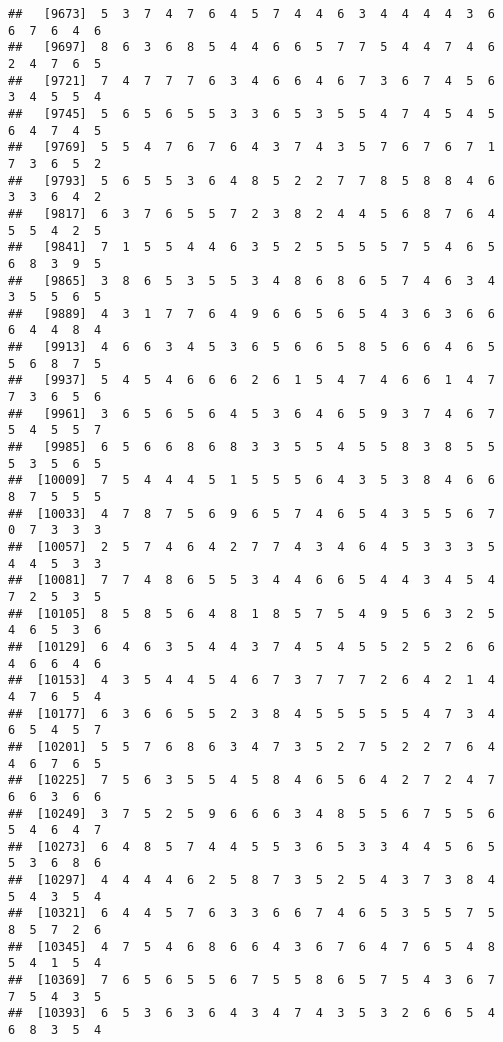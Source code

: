 \documentclass[
]{book}
\begin{document}
\begin{verbatim}
##   [9673]  5  3  7  4  7  6  4  5  7  4  4  6  3  4  4  4  4  3  6  6  7  6  4  6
##   [9697]  8  6  3  6  8  5  4  4  6  6  5  7  7  5  4  4  7  4  6  2  4  7  6  5
##   [9721]  7  4  7  7  7  6  3  4  6  6  4  6  7  3  6  7  4  5  6  3  4  5  5  4
##   [9745]  5  6  5  6  5  5  3  3  6  5  3  5  5  4  7  4  5  4  5  6  4  7  4  5
##   [9769]  5  5  4  7  6  7  6  4  3  7  4  3  5  7  6  7  6  7  1  7  3  6  5  2
##   [9793]  5  6  5  5  3  6  4  8  5  2  2  7  7  8  5  8  8  4  6  3  3  6  4  2
##   [9817]  6  3  7  6  5  5  7  2  3  8  2  4  4  5  6  8  7  6  4  5  5  4  2  5
##   [9841]  7  1  5  5  4  4  6  3  5  2  5  5  5  5  7  5  4  6  5  6  8  3  9  5
##   [9865]  3  8  6  5  3  5  5  3  4  8  6  8  6  5  7  4  6  3  4  3  5  5  6  5
##   [9889]  4  3  1  7  7  6  4  9  6  6  5  6  5  4  3  6  3  6  6  6  4  4  8  4
##   [9913]  4  6  6  3  4  5  3  6  5  6  6  5  8  5  6  6  4  6  5  5  6  8  7  5
##   [9937]  5  4  5  4  6  6  6  2  6  1  5  4  7  4  6  6  1  4  7  7  3  6  5  6
##   [9961]  3  6  5  6  5  6  4  5  3  6  4  6  5  9  3  7  4  6  7  5  4  5  5  7
##   [9985]  6  5  6  6  8  6  8  3  3  5  5  4  5  5  8  3  8  5  5  5  3  5  6  5
##  [10009]  7  5  4  4  4  5  1  5  5  5  6  4  3  5  3  8  4  6  6  8  7  5  5  5
##  [10033]  4  7  8  7  5  6  9  6  5  7  4  6  5  4  3  5  5  6  7  0  7  3  3  3
##  [10057]  2  5  7  4  6  4  2  7  7  4  3  4  6  4  5  3  3  3  5  4  4  5  3  3
##  [10081]  7  7  4  8  6  5  5  3  4  4  6  6  5  4  4  3  4  5  4  7  2  5  3  5
##  [10105]  8  5  8  5  6  4  8  1  8  5  7  5  4  9  5  6  3  2  5  4  6  5  3  6
##  [10129]  6  4  6  3  5  4  4  3  7  4  5  4  5  5  2  5  2  6  6  4  6  6  4  6
##  [10153]  4  3  5  4  4  5  4  6  7  3  7  7  7  2  6  4  2  1  4  4  7  6  5  4
##  [10177]  6  3  6  6  5  5  2  3  8  4  5  5  5  5  5  4  7  3  4  6  5  4  5  7
##  [10201]  5  5  7  6  8  6  3  4  7  3  5  2  7  5  2  2  7  6  4  4  6  7  6  5
##  [10225]  7  5  6  3  5  5  4  5  8  4  6  5  6  4  2  7  2  4  7  6  6  3  6  6
##  [10249]  3  7  5  2  5  9  6  6  6  3  4  8  5  5  6  7  5  5  6  5  4  6  4  7
##  [10273]  6  4  8  5  7  4  4  5  5  3  6  5  3  3  4  4  5  6  5  5  3  6  8  6
##  [10297]  4  4  4  4  6  2  5  8  7  3  5  2  5  4  3  7  3  8  4  5  4  3  5  4
##  [10321]  6  4  4  5  7  6  3  3  6  6  7  4  6  5  3  5  5  7  5  8  5  7  2  6
##  [10345]  4  7  5  4  6  8  6  6  4  3  6  7  6  4  7  6  5  4  8  5  4  1  5  4
##  [10369]  7  6  5  6  5  5  6  7  5  5  8  6  5  7  5  4  3  6  7  7  5  4  3  5
##  [10393]  6  5  3  6  3  6  4  3  4  7  4  3  5  3  2  6  6  5  4  6  8  3  5  4

\end{verbatim}
\end{document}
